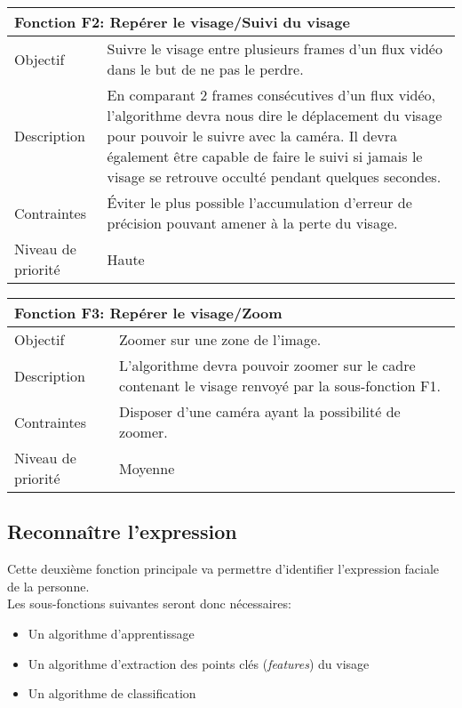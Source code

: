 \documentclass[poster]{polytech/polytech}
\begin{document}
\begin{tabular}{|l|p{12.5cm}|}
   \hline
   \multicolumn{2}{|l|}{\textbf{Fonction F2: Repérer le visage/Suivi du visage}} \\
   \hline
   Objectif &Suivre le visage entre plusieurs frames d'un flux vidéo dans le but de ne pas le perdre. \\
   \hline
   Description &En comparant 2 frames consécutives d'un flux vidéo, l'algorithme devra nous dire le déplacement du visage pour pouvoir le suivre avec la caméra. Il devra également être capable de faire le suivi si jamais le visage se retrouve occulté pendant quelques secondes. \\
   \hline
   Contraintes &Éviter le plus possible l'accumulation d'erreur de précision pouvant amener à la perte du visage. \\
   \hline
   Niveau de priorité &Haute \\
   \hline
\end{tabular}

\begin{tabular}{|l|p{12.5cm}|}
   \hline
   \multicolumn{2}{|l|}{\textbf{Fonction F3: Repérer le visage/Zoom}} \\
   \hline
   Objectif &Zoomer sur une zone de l'image. \\
   \hline
   Description &L'algorithme devra pouvoir zoomer sur le cadre contenant le visage renvoyé par la sous-fonction F1. \\
   \hline
   Contraintes &Disposer d'une caméra ayant la possibilité de zoomer. \\
   \hline
   Niveau de priorité &Moyenne \\
   \hline
\end{tabular}
\newpage
\subsection{Reconnaître l'expression}
Cette deuxième fonction principale va permettre d'identifier l'expression faciale de la personne.\\
Les sous-fonctions suivantes seront donc nécessaires:
\begin{itemize}
\item Un algorithme d'apprentissage
\item Un algorithme d'extraction des points clés (\textit{features}) du visage
\item Un algorithme de classification\\
\end{itemize}
\end{document}
